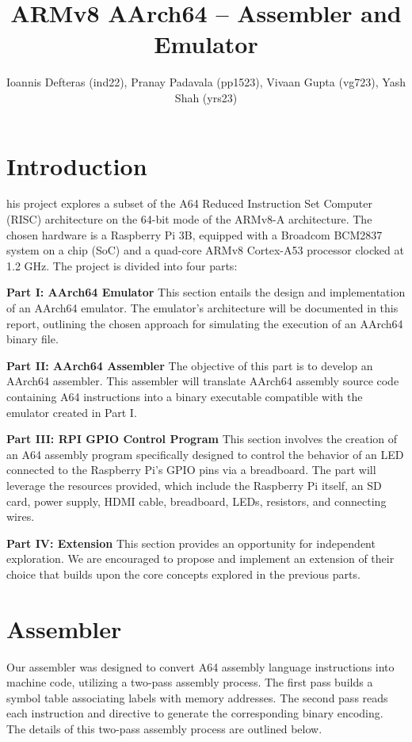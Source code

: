 \documentclass[9pt,a4paper,twoside]{tau-class/tau}
\title{ARMv8 AArch64 – Assembler and Emulator}
\author{Ioannis Defteras (ind22), Pranay Padavala (pp1523), Vivaan Gupta (vg723), Yash Shah (yrs23)}
\begin{document}
		
    \maketitle 
    \thispagestyle{firststyle} \tauabstract
    \tableofcontents

\section{Introduction}  
    his project explores a subset of the A64 Reduced Instruction Set Computer (RISC) architecture on the 64-bit mode of the ARMv8-A architecture. The chosen hardware is a Raspberry Pi 3B, equipped with a Broadcom BCM2837 system on a chip (SoC) and a quad-core ARMv8 Cortex-A53 processor clocked at 1.2 GHz. The project is divided into four parts: 
    
    \textbf{Part I: AArch64 Emulator }    
    This section entails the design and implementation of an AArch64 emulator. The emulator's architecture will be documented in this report, outlining the chosen approach for simulating the execution of an AArch64 binary file.
    
    \textbf{Part II: AArch64 Assembler }
    The objective of this part is to develop an AArch64 assembler. This assembler will translate AArch64 assembly source code containing A64 instructions into a binary executable compatible with the emulator created in Part I. 
    
    \textbf{Part III: RPI GPIO Control Program }    
    This section involves the creation of an A64 assembly program specifically designed to control the behavior of an LED connected to the Raspberry Pi's GPIO pins via a breadboard.  The part will leverage the resources provided, which include the Raspberry Pi itself, an SD card, power supply, HDMI cable, breadboard, LEDs, resistors, and connecting wires.  
    
    \textbf{Part IV: Extension }     
     This section provides an opportunity for independent exploration. We are encouraged to propose and implement an extension of their choice that builds upon the core concepts explored in the previous parts.
     
\section{Assembler}
    Our assembler was designed to convert A64 assembly language instructions into machine code, utilizing a two-pass assembly process. The first pass builds a symbol table associating labels with memory addresses. The second pass reads each instruction and directive to generate the corresponding binary encoding. The details of this two-pass assembly process are outlined below. 
\end{document}

